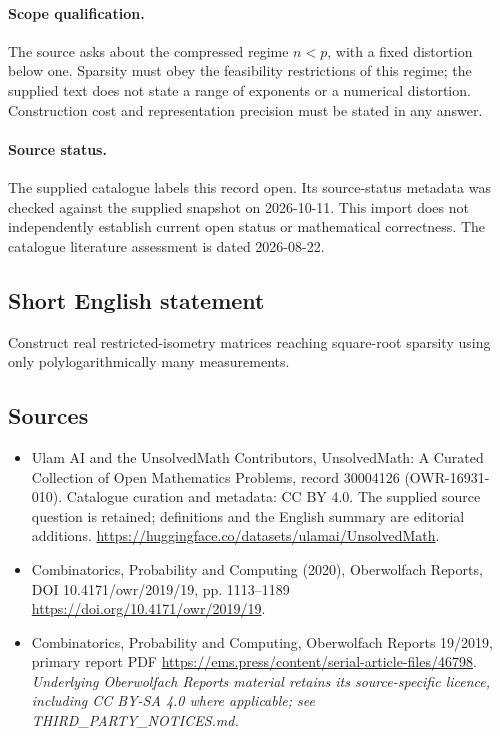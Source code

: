 \documentclass[11pt]{article}
\begin{document}
\paragraph{Scope qualification.}
The source asks about the compressed regime $n<p$, with a fixed distortion below one. Sparsity must obey the feasibility restrictions of this regime; the supplied text does not state a range of exponents or a numerical distortion. Construction cost and representation precision must be stated in any answer.
\paragraph{Source status.}
The supplied catalogue labels this record open. Its source-status metadata was checked against the supplied snapshot on 2026-10-11. This import does not independently establish current open status or mathematical correctness. The catalogue literature assessment is dated 2026-08-22.
\subsection{Short English statement}
Construct real restricted-isometry matrices reaching square-root sparsity using only polylogarithmically many measurements.
\subsection{Sources}
\begin{itemize}
\item[S1] Ulam AI and the UnsolvedMath Contributors, UnsolvedMath: A Curated Collection of Open Mathematics Problems, record 30004126 (OWR-16931-010). Catalogue curation and metadata: CC BY 4.0. The supplied source question is retained; definitions and the English summary are editorial additions.
\url{https://huggingface.co/datasets/ulamai/UnsolvedMath}.
\item[S2] Combinatorics, Probability and Computing (2020), Oberwolfach Reports, DOI 10.4171/owr/2019/19, pp. 1113--1189
\url{https://doi.org/10.4171/owr/2019/19}.
\item[S3] Combinatorics, Probability and Computing, Oberwolfach Reports 19/2019, primary report PDF
\url{https://ems.press/content/serial-article-files/46798}.
\textit{Underlying Oberwolfach Reports material retains its source-specific licence, including CC BY-SA 4.0 where applicable; see THIRD\_PARTY\_NOTICES.md.}
\end{itemize}
\end{document}
